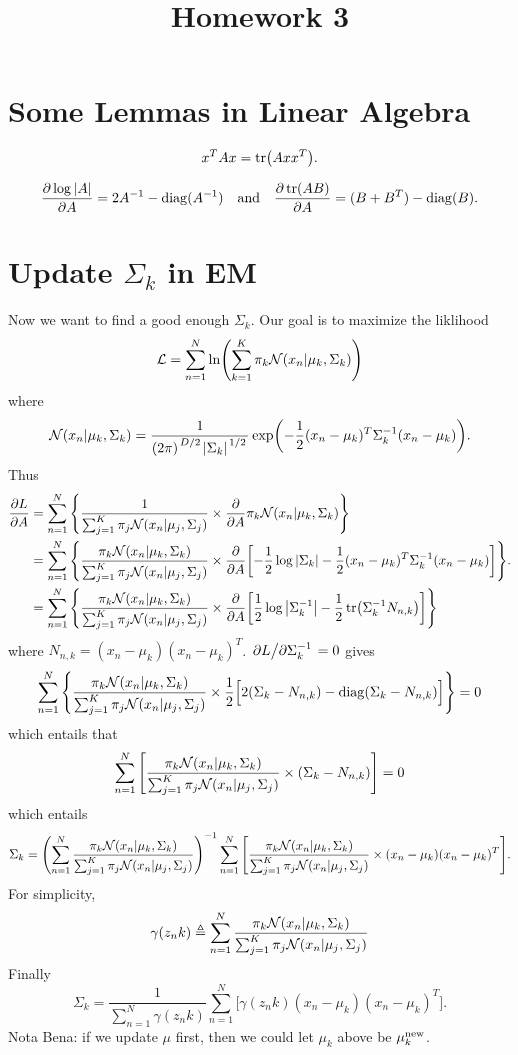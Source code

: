 \documentclass{article}
\begin{document}
\title{\vspace{-1.5cm}Homework 3}
\maketitle

\section{Some Lemmas in Linear Algebra}
\begin{lemma}
	\[
		x^TA x=\tr(A xx^T)
	.\] 
\end{lemma}
\begin{lemma}
	\[
		\pdv{\log\abs{A}}{A}=2A^{-1}-\-{diag}(A^{-1})
		\qand
		\pdv{\tr(AB)}{A}=(B+B^T)-\-{diag}(B)
	.\] 
\end{lemma}
\section{Update $\Sigma_k$ in EM}
Now we want to find a good enough $\Sigma_k$. Our goal is to maximize the liklihood 
\[
	\+L=\sum^{N}_{n=1} \ln(\sum^{K}_{k=1} \pi_k\+N(x_n|\mu_k,\Sigma_k))
\] where 
\[
	\+N(x_n|\mu_k,\Sigma_k)
	=
	\frac{1}{\qty(2\pi)^{\flatfrac{D}{2}}\abs{\Sigma_k}^{\flatfrac{1}{2}}}
	\exp(-\frac{1}{2}(x_n-\mu_k)^T\Sigma_k^{-1}(x_n-\mu_k))
.\] 
Thus
\[
    \begin{aligned}
		\pdv{L}{A}
		&=
		\sum^{N}_{n=1} \qty{
			\frac{1}{\sum^{K}_{j=1} \pi_j\+N(x_n|\mu_j,\Sigma_j)}\times
			\pdv{A}\pi_k\+N(x_n|\mu_k,\Sigma_k)
		}
	    \\&=
		\sum^{N}_{n=1} \qty{
			\frac{\pi_k\+N(x_n|\mu_k,\Sigma_k)}{\sum^{K}_{j=1} \pi_j\+N(x_n|\mu_j,\Sigma_j)}\times
			\pdv{A}\qty[-\frac{1}{2}\log\abs{\Sigma_k}-\frac{1}{2}(x_n-\mu_k)^T\Sigma_k^{-1}(x_n-\mu_k)]
		}
		\\&=
		\sum^{N}_{n=1} \qty{
			\frac{\pi_k\+N(x_n|\mu_k,\Sigma_k)}{\sum^{K}_{j=1} \pi_j\+N(x_n|\mu_j,\Sigma_j)}\times
			\pdv{A}
			\qty[\frac{1}{2}\log\abs{\Sigma_k^{-1}}-\frac{1}{2}\tr(\Sigma_k^{-1}N_{n,k})]
		}
    \end{aligned}
.\] 
where $N_{n,k}=(x_n-\mu_k)(x_n-\mu_k)^T$. $\pdv*{L}{\Sigma_k^{-1}}=0$ gives
\[
    \sum^{N}_{n=1} \qty{
			\frac{\pi_k\+N(x_n|\mu_k,\Sigma_k)}{\sum^{K}_{j=1} \pi_j\+N(x_n|\mu_j,\Sigma_j)}\times
			\frac{1}{2}\Big[2(\Sigma_k-N_{n,k})-\-{diag}(\Sigma_k-N_{n,k})\Big]
		}=0
\] 
which entails that
\[
	\sum^{N}_{n=1} \qty[
		\frac{\pi_k\+N(x_n|\mu_k,\Sigma_k)}{\sum^{K}_{j=1} \pi_j\+N(x_n|\mu_j,\Sigma_j)}\times
		(\Sigma_k-N_{n,k})
	]=0
\] 
which entails
\[
    \Sigma_k=
	\qty(\sum^{N}_{n=1}
		\frac{\pi_k\+N(x_n|\mu_k,\Sigma_k)}{\sum^{K}_{j=1} \pi_j\+N(x_n|\mu_j,\Sigma_j)})^{-1}
	\sum^{N}_{n=1} \qty[
		\frac{\pi_k\+N(x_n|\mu_k,\Sigma_k)}{\sum^{K}_{j=1} \pi_j\+N(x_n|\mu_j,\Sigma_j)}\times
		(x_n-\mu_k)(x_n-\mu_k)^T
	]
.\] 
For simplicity, 
\[
	\gamma(z_nk)
	\defeq
	\sum^{N}_{n=1}\frac{\pi_k\+N(x_n|\mu_k,\Sigma_k)}{\sum^{K}_{j=1} \pi_j\+N(x_n|\mu_j,\Sigma_j)}
\]
Finally
\[
    \Sigma_k=
	\frac{1}{\sum^{N}_{n=1}\gamma(z_nk)}
	\sum^{N}_{n=1} \Big[
		\gamma(z_nk)(x_n-\mu_k)(x_n-\mu_k)^T
	\Big]
.\] 
Nota Bena: if we update $\mu$ first, then we could let $\mu_k$ above be  $\mu^{\-{new}}_k$.
\end{document}
